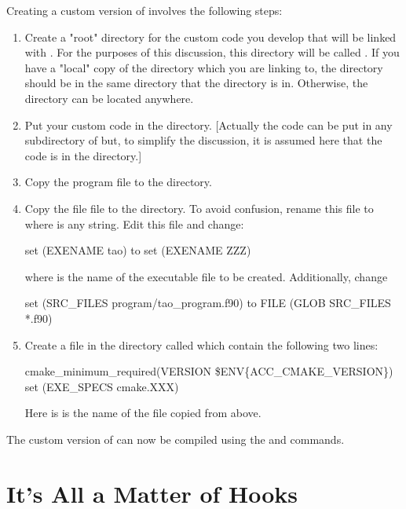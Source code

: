 Creating a custom version of \tao involves the following steps:
  \begin{enumerate}
  \item
Create a "root" directory for the custom code you develop that
will be linked with \tao. For the purposes of this discussion, 
this directory will be called . If you have a "local" copy of
the  directory which you are linking to, the  directory
should be in the same directory that the  directory is in.
Otherwise, the  directory can be located anywhere.
  \item
Put your custom code in the  directory. [Actually the
code can be put in any subdirectory of  but, to simplify
the discussion, it is assumed here that the code is in the
 directory.]
  \item
Copy the program file  
to the  directory.
  \item
Copy the file  file to the  directory.
To avoid confusion, rename this file to  where 
is any string. Edit this file and change:
\begin{example}
  set (EXENAME tao) 
to
  set (EXENAME ZZZ)
\end{example}
where  is the name of the executable file to be created.
Additionally, change
\begin{example}
	set (SRC_FILES program/tao_program.f90)
to
  FILE (GLOB SRC_FILES *.f90)
\end{example}
  \item
Create a file in the  directory called 
which contain the following two lines:
\begin{example}
  cmake_minimum_required(VERSION \$ENV\{ACC_CMAKE_VERSION\})
  set (EXE_SPECS cmake.XXX)
\end{example}
Here  is is the name of the file copied from 
 above.
  \end{enumerate}

The custom version of \tao can now be compiled using 
the  and  commands.

\section{It's All a Matter of Hooks}

